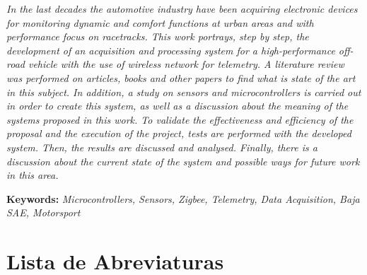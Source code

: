 \textit{
\noindent In the last decades the automotive industry have been acquiring electronic devices for monitoring dynamic and comfort functions at urban areas and with performance focus on racetracks. This work portrays, step by step, the development of an acquisition and processing system for a high-performance off-road vehicle with the use of wireless network for telemetry. A literature review was performed on articles, books and other papers to find what is state of the art in this subject. In addition, a study on sensors and microcontrollers is carried out in order to create this system, as well as a discussion about the meaning of the systems proposed in this work. To validate the effectiveness and efficiency of the proposal and the execution of the project, tests are performed with the developed system. Then, the results are discussed and analysed. Finally, there is a discussion about the current state of the system and possible ways for future work in this area.        
}



\noindent \textbf{Keywords:} \textit{Microcontrollers, Sensors, Zigbee, Telemetry, Data Acquisition, Baja SAE, Motorsport} 


\tableofcontents
\listoffigures
\listoftables
\newpage
\chapter*{Lista de Abreviaturas\hfill} 
\listofsymbols

\newpage
\pagestyle{myheadings}
